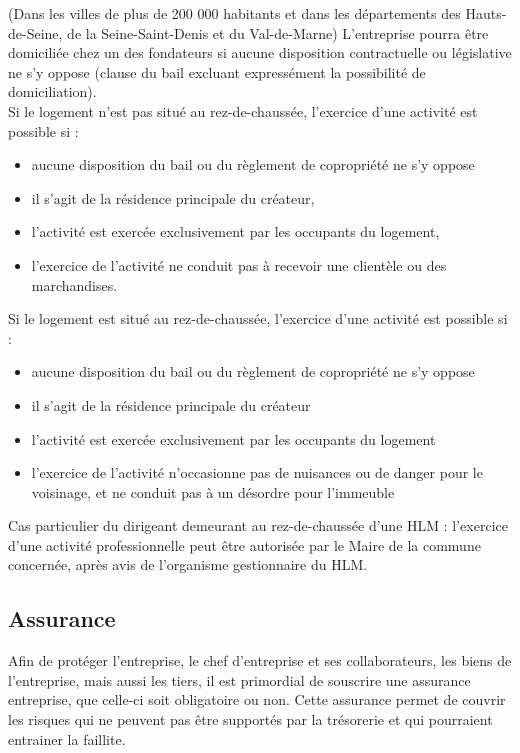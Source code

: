 \documentclass[10pt]{article}
\begin{document}
(Dans les villes de plus de 200 000 habitants et dans les départements des Hauts-de-Seine, de la Seine-Saint-Denis et du Val-de-Marne) L'entreprise pourra être domiciliée chez un des fondateurs si aucune disposition contractuelle ou législative ne s'y oppose (clause du bail excluant expressément la possibilité de domiciliation).\\

Si le logement n'est pas situé au rez-de-chaussée, l'exercice d'une activité est possible si :
\begin{itemize}
	\item aucune disposition du bail ou du règlement de copropriété ne s'y oppose
	\item il s'agit de la résidence principale du créateur,
	\item l'activité est exercée exclusivement par les occupants du logement,
	\item l'exercice de l'activité ne conduit pas à recevoir une clientèle ou des marchandises.
\end{itemize}

Si le logement est situé au rez-de-chaussée, l'exercice d'une activité est possible  si :
\begin{itemize}
	\item aucune disposition du bail ou du règlement de copropriété ne s'y oppose
	\item il s'agit de la résidence principale du créateur
	\item l'activité est exercée exclusivement par les occupants du logement
	\item l'exercice de l'activité n'occasionne pas de nuisances ou de danger pour le voisinage, et ne conduit pas à un désordre pour l'immeuble \\
\end{itemize}

Cas particulier du dirigeant demeurant au rez-de-chaussée d'une HLM : l'exercice d'une activité professionnelle peut être autorisée par le Maire de la commune concernée, après avis de l'organisme gestionnaire du HLM.

\subsection{Assurance}
\label{sub:assurance}
Afin de protéger l'entreprise, le chef d'entreprise et ses collaborateurs, les biens de l'entreprise, mais aussi les tiers, il est primordial de souscrire une assurance entreprise, que celle-ci soit obligatoire ou non. Cette assurance permet de couvrir les risques qui ne peuvent pas être supportés par la trésorerie et qui pourraient entrainer la faillite.
\end{document}
